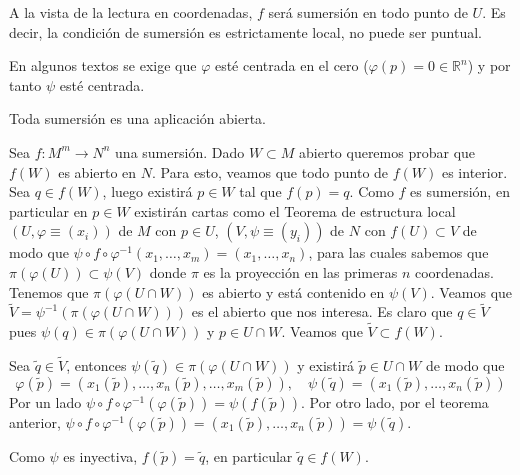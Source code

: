 \begin{obs}
A la vista de la lectura en coordenadas, $f$ será sumersión en todo punto de $U$. Es decir, la condici\'on de sumersi\'on es estrictamente local, no puede ser puntual. 
\end{obs}
\begin{obs}
En algunos textos se exige que $\varphi$ esté centrada en el cero ($\varphi(p) = 0 \in \mathbb{R}^n$) y por tanto $\psi$ esté centrada.
\end{obs}

\begin{prop}
Toda sumersión es una aplicación abierta.
\end{prop}
\begin{dem}
Sea $f:M^m \to N^n$ una sumersión. Dado $W \subset M$ abierto queremos probar que $f(W)$ es abierto en $N$. Para esto, veamos que todo punto de $f(W)$ es interior. Sea $q \in f(W)$, luego existirá $p \in W$ tal que $f(p) = q$. Como $f$ es sumersión, en particular en $p \in W$ existirán cartas como el Teorema de estructura local $(U,\varphi\equiv (x_i))$ de $M$ con $p \in U$, $(V,\psi \equiv (y_i))$ de $N$ con $f(U)\subset V$ de modo que $\psi \circ f \circ \varphi^{-1}(x_1,\dots,x_m) = (x_1,\dots,x_n)$, para las cuales sabemos que $\pi(\varphi(U))\subset \psi(V)$ donde $\pi$ es la proyecci\'on en las primeras $n$ coordenadas. Tenemos que $\pi(\varphi(U \cap W))$ es abierto y está contenido en $\psi(V)$. Veamos que $\tilde{V} = \psi^{-1}(\pi(\varphi(U \cap W)))$ es el abierto que nos interesa. Es claro que $q \in \tilde{V}$ pues $\psi(q) \in  \pi(\varphi(U \cap W))$ y $p \in U \cap W$.  Veamos que $\tilde{V} \subset f(W)$. 

Sea $\tilde{q} \in \tilde{V}$, entonces $\psi(\tilde{q}) \in \pi(\varphi(U\cap W))$ y existirá $\tilde{p} \in U \cap W$ de modo que $$\varphi(\tilde{p}) = (x_1(\tilde{p}), \dots, x_n(\tilde{p}), \dots, x_m(\tilde{p})), \quad \psi(\tilde{q}) = (x_1(\tilde{p}),\dots,x_n(\tilde{p}))$$
Por un lado $\psi \circ f \circ \varphi^{-1} (\varphi(\tilde{p})) = \psi(f(\tilde{p}))$. Por otro lado, por el teorema anterior, $\psi \circ f \circ \varphi^{-1} (\varphi(\tilde{p})) = (x_1(\tilde{p}),\dots,x_n(\tilde{p})) = \psi(\tilde{q})$. 

Como $\psi$ es inyectiva, $f(\tilde{p}) = \tilde{q}$, en particular $\tilde{q} \in f(W)$.

\end{dem}
